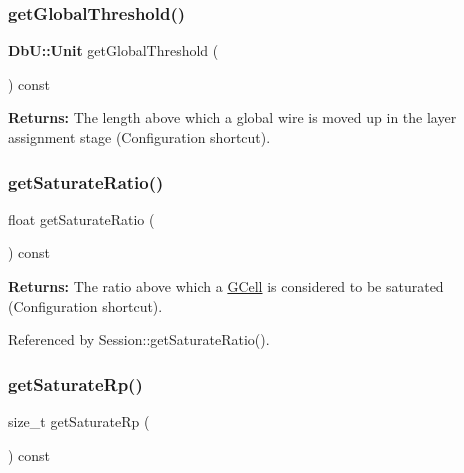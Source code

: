 \subsubsection{\texorpdfstring{get\+Global\+Threshold()}{getGlobalThreshold()}}
{\footnotesize\ttfamily \textbf{ Db\+U\+::\+Unit} get\+Global\+Threshold (\begin{DoxyParamCaption}{ }\end{DoxyParamCaption}) const\hspace{0.3cm}{\ttfamily [inline]}}

{\bfseries Returns\+:} The length above which a global wire is moved up in the layer assignment stage (Configuration shortcut). \mbox{\label{classKatabatic_1_1KatabaticEngine_a44d2c1fbd97dd09b102b461e906367a0}} 
\subsubsection{\texorpdfstring{get\+Saturate\+Ratio()}{getSaturateRatio()}}
{\footnotesize\ttfamily float get\+Saturate\+Ratio (\begin{DoxyParamCaption}{ }\end{DoxyParamCaption}) const\hspace{0.3cm}{\ttfamily [inline]}}

{\bfseries Returns\+:} The ratio above which a \mbox{\hyperlink{classKatabatic_1_1GCell}{G\+Cell}} is considered to be saturated (Configuration shortcut). 

Referenced by Session\+::get\+Saturate\+Ratio().

\mbox{\label{classKatabatic_1_1KatabaticEngine_a61977cc1fd981e7f1c6125189ed20509}} 
\subsubsection{\texorpdfstring{get\+Saturate\+Rp()}{getSaturateRp()}}
{\footnotesize\ttfamily size\+\_\+t get\+Saturate\+Rp (\begin{DoxyParamCaption}{ }\end{DoxyParamCaption}) const\hspace{0.3cm}{\ttfamily [inline]}}

